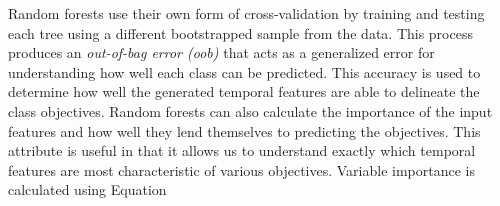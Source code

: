 Random forests use their own form of cross-validation by training and testing each tree using a different bootstrapped sample from the data. This process produces an \emph{out-of-bag error (oob)} that acts as a generalized error for understanding how well each class can be predicted. This accuracy is used to determine how well the generated temporal features are able to delineate the class objectives. Random forests can also calculate the importance of the input features and how well they lend themselves to predicting the objectives. This attribute is useful in that it allows us to understand exactly which temporal features are most characteristic of various objectives. Variable importance is calculated using Equation

